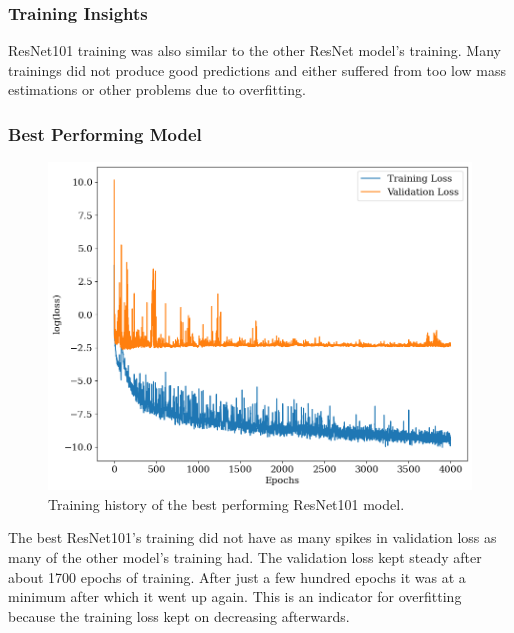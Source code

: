 \subsubsection*{Training Insights}
ResNet101 training was also similar to the other ResNet model's training. Many trainings did not produce good predictions and either suffered from too low mass estimations or other problems due to overfitting. 


\subsubsection*{Best Performing Model}

\begin{figure}[H]
\centering
\includegraphics[width=.667\textwidth]{images/Chapter4/Res101/res101_history.png}
\caption{Training history of the best performing ResNet101 model.} 
\label{fig:resnet101_best_history}
\end{figure}

The best ResNet101's training did not have as many spikes in validation loss as many of the other model's training had. The validation loss kept steady after about 1700 epochs of training. After just a few hundred epochs it was at a minimum after which it went up again. This is an indicator for overfitting because the training loss kept on decreasing afterwards. 

